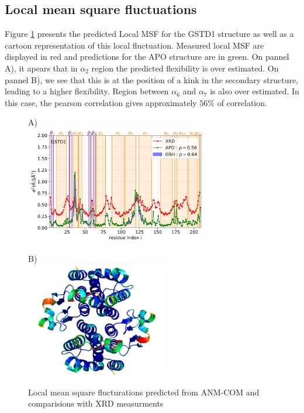 \subsection{Local mean square fluctuations}
Figure \ref{Local MSF D1} presents the predicted Local MSF for the GSTD1 structure as well as a cartoon representation of this local fluctuation. Measured local MSF are displayed in red and predictions for the APO structure are in green. On pannel A), it apears that in $\alpha_2$ region the predicted flexibility is over estimated. On pannel B), we see that this is at the position of a kink in the secondary structure, leading to a higher flexibility. Region between $\alpha_6$ and $\alpha_7$ is also over estimated. In this case, the pearson correlation gives approximately $56\%$ of correlation.

\begin{figure}[h!]
	\label{Local MSF D1}
	\begin{minipage}{.48\linewidth}
		A)\\
		\includegraphics[width = 8cm]{figures/GSTD1+GSH_ANM-COM_Bfactors.jpg}
	\end{minipage}
	\begin{minipage}{.48\linewidth}
		B)\\
		\includegraphics[height = 5cm]{figures/GSTD1_ANM-COM_Bfactors_structure.png}
	\end{minipage}
	\caption{Local mean square flucturations predicted from ANM-COM and comparisions with XRD measurments}
\end{figure}

